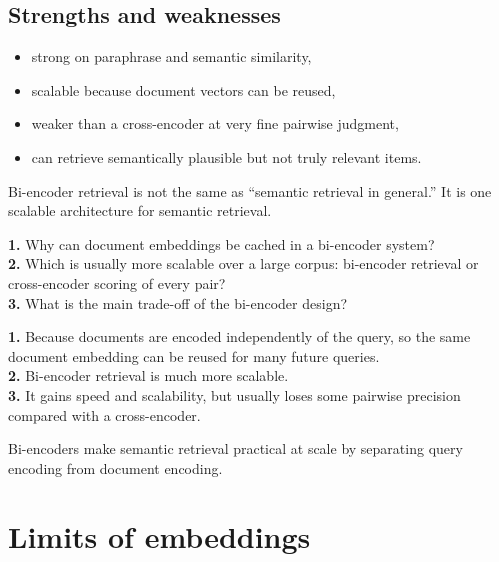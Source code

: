 \documentclass[11pt,oneside]{report}
\begin{document}
\section*{Strengths and weaknesses}
\begin{itemize}
\item strong on paraphrase and semantic similarity,
\item scalable because document vectors can be reused,
\item weaker than a cross-encoder at very fine pairwise judgment,
\item can retrieve semantically plausible but not truly relevant items.
\end{itemize}

\begin{warningbox}
Bi-encoder retrieval is not the same as ``semantic retrieval in general.'' It is one scalable architecture for semantic retrieval.
\end{warningbox}

\begin{selfcheckbox}
\textbf{1.} Why can document embeddings be cached in a bi-encoder system?\\
\textbf{2.} Which is usually more scalable over a large corpus: bi-encoder retrieval or cross-encoder scoring of every pair?\\
\textbf{3.} What is the main trade-off of the bi-encoder design?
\end{selfcheckbox}

\begin{answerbox}
\textbf{1.} Because documents are encoded independently of the query, so the same document embedding can be reused for many future queries.\\
\textbf{2.} Bi-encoder retrieval is much more scalable.\\
\textbf{3.} It gains speed and scalability, but usually loses some pairwise precision compared with a cross-encoder.
\end{answerbox}

\begin{rememberbox}
Bi-encoders make semantic retrieval practical at scale by separating query encoding from document encoding.
\end{rememberbox}


\chapter[Limits of Embeddings]{Limits of embeddings}
\end{document}
